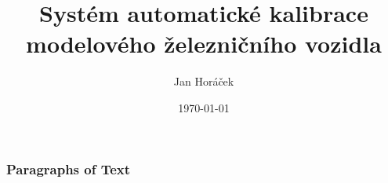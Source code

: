 \documentclass[aspectratio=169]{beamer}
\title[Automatická kalibrace]{Systém automatické kalibrace modelového
železničního vozidla}
\author{Jan Horáček}
\institute[FI MUNI]{
	Fakulta informatiky \\
	Masarykova univerzita \\
	\medskip
	\textit{horacekj@mail.muni.cz}
}
\date{\today}
\begin{document}

\begin{frame}
\titlepage
\end{frame}


\begin{frame}
\frametitle{Paragraphs of Text}
\end{frame}

\end{document}
